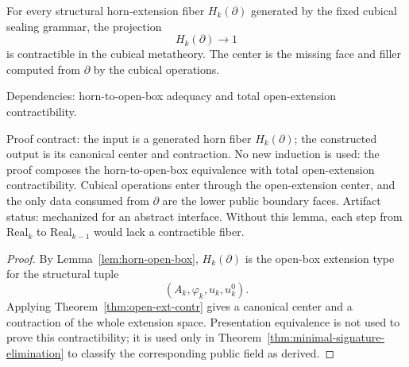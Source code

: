 \documentclass{lmcs}
\newcommand{\Real}{\mathrm{Real}}
\begin{document}
\begin{lem}
\label{lem:kan-contraction-horn-fibers}
For every structural horn-extension fiber \(H_k(\partial)\) generated by the fixed cubical
sealing grammar, the projection
\[
  H_k(\partial) \to 1
\]
is contractible in the cubical metatheory.  The center is the missing face and filler computed
from \(\partial\) by the cubical operations.

Dependencies: horn-to-open-box adequacy and total open-extension contractibility.

Proof contract: the input is a generated horn fiber \(H_k(\partial)\); the
constructed output is its canonical center and contraction.  No new induction
is used: the proof composes the horn-to-open-box equivalence with total
open-extension contractibility.  Cubical operations enter through the
open-extension center, and the only data consumed from \(\partial\) are the
lower public boundary faces.  Artifact status: mechanized for an abstract
interface.  Without this lemma, each step from \(\Real_k\) to
\(\Real_{k-1}\) would lack a contractible fiber.
\end{lem}

\begin{proof}
By Lemma~\ref{lem:horn-open-box}, \(H_k(\partial)\) is the open-box extension type for the
structural tuple
\[
  (A_k,\varphi_k,u_k,u^0_k).
\]
Applying
Theorem~\ref{thm:open-ext-contr} gives a canonical center and a contraction of the whole
extension space.  Presentation equivalence is not used to prove this contractibility; it is
used only in Theorem~\ref{thm:minimal-signature-elimination} to classify the corresponding
public field as derived.
\end{proof}
\end{document}
